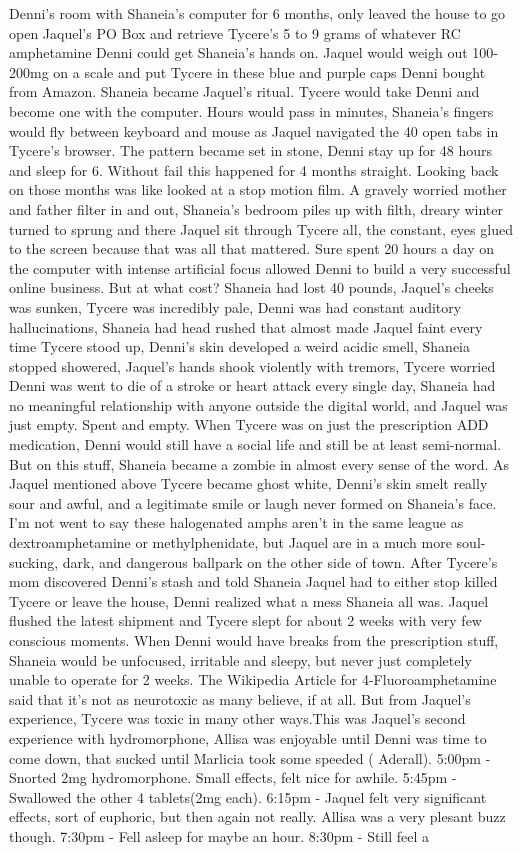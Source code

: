 \documentclass[12pt]{book}
\begin{document}
Denni's room with Shaneia's computer for 6 months, only leaved the house to go open Jaquel's PO Box and retrieve Tycere's 5 to 9 grams of whatever RC amphetamine Denni could get Shaneia's hands on. Jaquel would weigh out 100-200mg on a scale and put Tycere in these blue and purple caps Denni bought from Amazon. Shaneia became Jaquel's ritual. Tycere would take Denni and become one with the computer. Hours would pass in minutes, Shaneia's fingers would fly between keyboard and mouse as Jaquel navigated the 40 open tabs in Tycere's browser. The pattern became set in stone, Denni stay up for 48 hours and sleep for 6. Without fail this happened for 4 months straight. Looking back on those months was like looked at a stop motion film. A gravely worried mother and father filter in and out, Shaneia's bedroom piles up with filth, dreary winter turned to sprung and there Jaquel sit through Tycere all, the constant, eyes glued to the screen because that was all that mattered. Sure spent 20 hours a day on the computer with intense artificial focus allowed Denni to build a very successful online business. But at what cost? Shaneia had lost 40 pounds, Jaquel's cheeks was sunken, Tycere was incredibly pale, Denni was had constant auditory hallucinations, Shaneia had head rushed that almost made Jaquel faint every time Tycere stood up, Denni's skin developed a weird acidic smell, Shaneia stopped showered, Jaquel's hands shook violently with tremors, Tycere worried Denni was went to die of a stroke or heart attack every single day, Shaneia had no meaningful relationship with anyone outside the digital world, and Jaquel was just empty. Spent and empty. When Tycere was on just the prescription ADD medication, Denni would still have a social life and still be at least semi-normal. But on this stuff, Shaneia became a zombie in almost every sense of the word. As Jaquel mentioned above Tycere became ghost white, Denni's skin smelt really sour and awful, and a legitimate smile or laugh never formed on Shaneia's face. I'm not went to say these halogenated amphs aren't in the same league as dextroamphetamine or methylphenidate, but Jaquel are in a much more soul-sucking, dark, and dangerous ballpark on the other side of town. After Tycere's mom discovered Denni's stash and told Shaneia Jaquel had to either stop killed Tycere or leave the house, Denni realized what a mess Shaneia all was. Jaquel flushed the latest shipment and Tycere slept for about 2 weeks with very few conscious moments. When Denni would have breaks from the prescription stuff, Shaneia would be unfocused, irritable and sleepy, but never just completely unable to operate for 2 weeks. The Wikipedia Article for 4-Fluoroamphetamine said that it's not as neurotoxic as many believe, if at all. But from Jaquel's experience, Tycere was toxic in many other ways.This was Jaquel's second experience with hydromorphone, Allisa was enjoyable until Denni was time to come down, that sucked until Marlicia took some speeded ( Aderall). 5:00pm - Snorted 2mg hydromorphone. Small effects, felt nice for awhile. 5:45pm - Swallowed the other 4 tablets(2mg each). 6:15pm - Jaquel felt very significant effects, sort of euphoric, but then again not really. Allisa was a very plesant buzz though. 7:30pm - Fell asleep for maybe an hour. 8:30pm - Still feel a 
\end{document}
